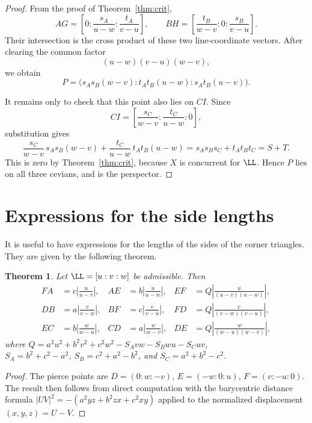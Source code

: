 \documentclass[12pt,a4paper]{amsart}
\newtheorem{theorem}{Theorem} [section]
\theoremstyle{remark}
\begin{document}
\begin{proof}
From the proof of Theorem~\ref{thm:crit},
\[
AG=
\left[
0:
\frac{s_A}{u-w}:
\frac{t_A}{v-u}
\right],
\qquad
BH=
\left[
\frac{t_B}{w-v}:
0:
\frac{s_B}{v-u}
\right].
\]
Their intersection is the cross product of these two line-coordinate vectors.
After clearing the common factor
\[
(u-w)(v-u)(w-v),
\]
we obtain
\[
P=
\bigl(
s_As_B(w-v):
t_At_B(u-w):
s_At_B(u-v)
\bigr).
\]

It remains only to check that this point also lies on $CI$.  Since
\[
CI=
\left[
\frac{s_C}{w-v}:
\frac{t_C}{u-w}:
0
\right],
\]
substitution gives
\[
\frac{s_C}{w-v}\,s_As_B(w-v)
+
\frac{t_C}{u-w}\,t_At_B(u-w)
=
s_As_Bs_C+t_At_Bt_C
=
S+T.
\]
This is zero by Theorem~\ref{thm:crit}, because $X$ is concurrent for $\LL$.  Hence $P$
lies on all three cevians, and is the perspector.
\end{proof}

\section{Expressions for the side lengths}

It is useful to have expressions for the lengths of the sides of the corner triangles.
They are given by the following theorem.

\begin{theorem}
\label{thm:cornerSideLengths}
Let $\LL=[u:v:w]$ be admissible.
Then
\begin{equation}
\label{eq:cornerSideLengths}
\begin{aligned}
FA&=c\left|\frac{u}{u-v}\right|,
&
AE&=b\left|\frac{u}{u-w}\right|,
&
EF&=Q\left|\frac{u}{(u-v)(u-w)}\right|,\\
DB&=a\left|\frac{v}{v-w}\right|,
&
BF&=c\left|\frac{v}{v-u}\right|,
&
FD&=Q\left|\frac{v}{(v-w)(v-u)}\right|,\\
EC&=b\left|\frac{w}{w-u}\right|,
&
CD&=a\left|\frac{w}{w-v}\right|,
&
DE&=Q\left|\frac{w}{(w-u)(w-v)}\right|,
\end{aligned}
\end{equation}
where
$Q=a^2u^2+b^2v^2+c^2w^2-S_Avw-S_Bwu-S_Cuv$,\\
$S_A=b^2+c^2-a^2$, $S_B=c^2+a^2-b^2$, and $S_C=a^2+b^2-c^2$.

\end{theorem}

\begin{proof}
The pierce points are $D=(0:w:-v)$, $E=(-w:0:u)$, $F=(v:-u:0)$.
The result then follows from
direct computation with the barycentric distance formula
$|UV|^2=-(a^2yz+b^2zx+c^2xy)$ applied to the normalized displacement
$(x,y,z)=U-V$.
\end{proof}
\end{document}
